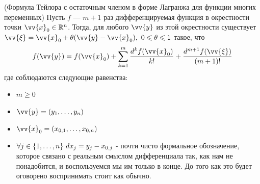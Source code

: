\begin{theorem} (Формула Тейлора с остаточным членом в форме Лагранжа для функции многих переменных)
	Пусть $f$ --- $m + 1$ раз дифференцируемая функция в окрестности точки $\vv{x}_0 \in \R^n$. Тогда, для любого $\vv{y}$ из этой окрестности существует $\vv{\xi} = \vv{x}_0 + \theta(\vv{y} - \vv{x}_0),\ 0 \le \theta \le 1$ такое, что
	\[
		f(\vv{y}) = f(\vv{x}_0) + \suml_{k = 1}^m \frac{d^k f(\vv{x}_0)}{k!} + \frac{d^{m + 1} f(\vv{\xi})}{(m + 1)!}
	\]
	где соблюдаются следующие равенства:
	\begin{itemize}
		\item \(m \ge 0\)
		\item \(\vv{y} = (y_1, \ldots, y_n)\)
		\item \(\vv{x}_0 = (x_{0, 1}, \ldots, x_{0, n})\)
		\item \(\forall j \in \{1, \ldots, n\}\ dx_j = y_j - x_{0, j}\) - почти чисто формальное обозначение, которое связано с реальным смыслом дифференциала так, как нам не понадобится, и воспользуемся мы им только в конце. До того как это будет оговорено воспринимать стоит как обычно.
	\end{itemize}
\end{theorem}

